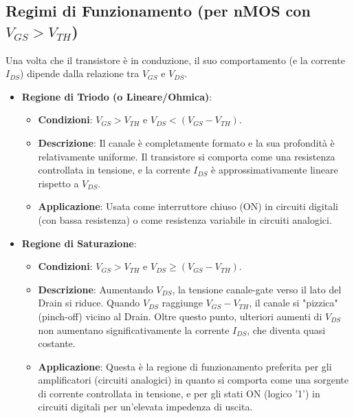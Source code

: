 \subsection{Regimi di Funzionamento (per nMOS con $V_{GS} > V_{TH}$)}
Una volta che il transistore è in conduzione, il suo comportamento (e la corrente $I_{DS}$) dipende dalla relazione tra $V_{GS}$ e $V_{DS}$.
\begin{itemize}
    \item \textbf{Regione di Triodo (o Lineare/Ohmica)}:
    \begin{itemize}
        \item \textbf{Condizioni}: $V_{GS} > V_{TH}$ e $V_{DS} < (V_{GS} - V_{TH})$.
        \item \textbf{Descrizione}: Il canale è completamente formato e la sua profondità è relativamente uniforme. Il transistore si comporta come una resistenza controllata in tensione, e la corrente $I_{DS}$ è approssimativamente lineare rispetto a $V_{DS}$.
    \item \textbf{Applicazione}: Usata come interruttore chiuso (ON) in circuiti digitali (con bassa resistenza) o come resistenza variabile in circuiti analogici.
    \end{itemize}
    \item \textbf{Regione di Saturazione}:
    \begin{itemize}
        \item \textbf{Condizioni}: $V_{GS} > V_{TH}$ e $V_{DS} \geq (V_{GS} - V_{TH})$.
        \item \textbf{Descrizione}: Aumentando $V_{DS}$, la tensione canale-gate verso il lato del Drain si riduce. Quando $V_{DS}$ raggiunge $V_{GS} - V_{TH}$, il canale si "pizzica" (pinch-off) vicino al Drain. Oltre questo punto, ulteriori aumenti di $V_{DS}$ non aumentano significativamente la corrente $I_{DS}$, che diventa quasi costante.
    \item \textbf{Applicazione}: Questa è la regione di funzionamento preferita per gli amplificatori (circuiti analogici) in quanto si comporta come una sorgente di corrente controllata in tensione, e per gli stati ON (logico '1') in circuiti digitali per un'elevata impedenza di uscita.
    \end{itemize}
\end{itemize}

